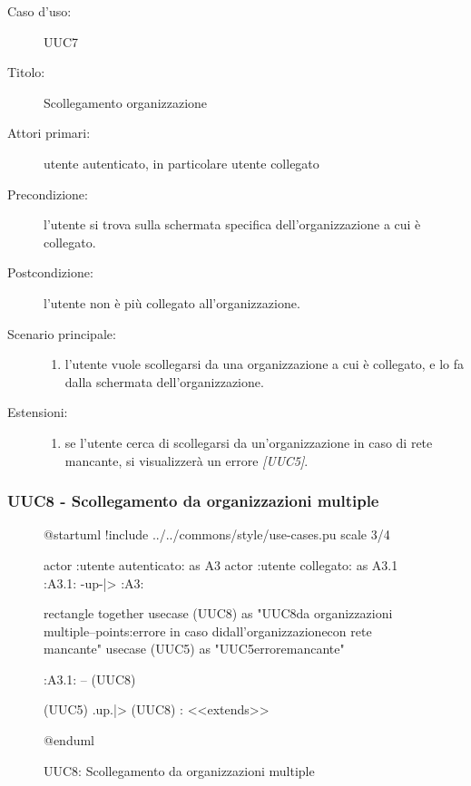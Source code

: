 \documentclass[casi-duso]{subfiles}
\begin{document}
\begin{description}
  \item[Caso d’uso:] UUC7
  \item[Titolo:] Scollegamento organizzazione
  \item[Attori primari:] utente autenticato, in particolare utente collegato
  \item[Precondizione:] l'utente si trova sulla schermata specifica dell'organizzazione a cui è collegato.
  \item[Postcondizione:] l'utente non è più collegato all'organizzazione.
  \item[Scenario principale:]
        \begin{enumerate}
          \item l'utente vuole scollegarsi da una organizzazione a cui è collegato, e lo fa dalla schermata dell'organizzazione.
        \end{enumerate}
  \item[Estensioni:]
        \begin{enumerate}
          \item se l'utente cerca di scollegarsi da un'organizzazione in caso di rete mancante, si visualizzerà un errore \emph{[UUC5]}.
        \end{enumerate}
\end{description}

\subsubsection{UUC8 - Scollegamento da organizzazioni multiple}%
\label{subsub:UUC8utente}

\begin{figure}[h!]
  \centering
  \begin{plantuml}
  @startuml
  !include ../../commons/style/use-cases.pu
  scale 3/4

  actor :utente autenticato: as A3
  actor :utente collegato: as A3.1
  :A3.1: -up-|> :A3:

  rectangle {
    together {
      usecase (UUC8) as "UUC8\nScollegamento da organizzazioni multiple\n--\nExtension points:\nVisualizzazione errore in caso di\nscollegamento dall'organizzazione\n con rete mancante"
      usecase (UUC5) as "UUC5\nVisualizzazione errore\nrete mancante"
    }
  }

  :A3.1: -- (UUC8)

  (UUC5) .up.|> (UUC8) : <<extends>>

  @enduml
  \end{plantuml}
  \caption{UUC8: Scollegamento da organizzazioni multiple}
  \label{fig:uuc8}
\end{figure}
\end{document}
